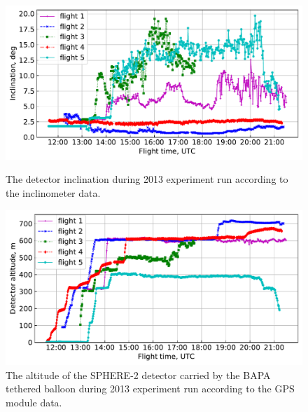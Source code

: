 \documentclass[final,5p,times,twocolumn]{elsarticle}
\begin{document}
\begin{figure}[tb]
    \begin{minipage}[t]{0.48\textwidth}
    \centering
    \includegraphics[width=\textwidth]{figs/ClinTh.pdf}
    \caption{The detector inclination during 2013 experiment run according to the inclinometer data.}
    \label{fig:inclination} 
    \end{minipage}
    \hfill
    \begin{minipage}[t]{0.48\textwidth}
    \centering
    \includegraphics[width=\textwidth]{figs/height.pdf}
    \caption{The altitude of the SPHERE-2 detector carried by the BAPA tethered balloon during 2013 experiment run according to the GPS module data.}
    \label{fig:height}
    \end{minipage}

  \vspace{1.5pc}


\end{figure}
\end{document}
